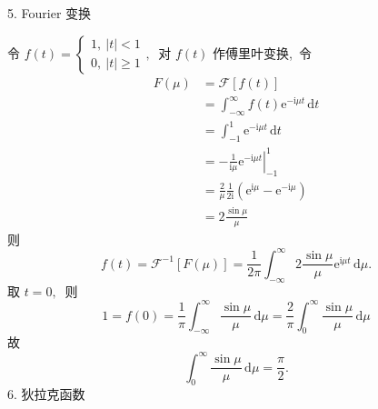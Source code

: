 \begin{solution}
		5. Fourier 变换
		
		令  $f(t)=\left\{\begin{array}{l}
			1,\ |t|<1 \\
			0,\ |t| \geq 1
		\end{array}\right. ,\ $ 对 $ f(t) $ 作傅里叶变换,\  令
		$$\begin{aligned}
			F(\mu) & =\mathscr{F}[f(t)] \\
			& =\int_{-\infty}^{\infty} f(t) \mathrm{e}^{-\mathrm{i} \mu t} \,\mathrm{d}t \\
			& =\int_{-1}^{1} \mathrm{e}^{-\mathrm{i} \mu t} \,\mathrm{d}t\\
			& =-\left.\frac{1}{\mathrm{i} \mu} \mathrm{e}^{-\mathrm{i} \mu t}\right|_{-1} ^{1} \\
			& =\frac{2}{\mu} \frac{1}{2 \mathrm{i}}\left(\mathrm{e}^{\mathrm{i} \mu}-\mathrm{e}^{-\mathrm{i} \mu}\right) \\
			& =2 \frac{\sin \mu}{\mu}
		\end{aligned}$$
		则  $$f(t)=\mathscr{F}^{-1}[F(\mu)]=\frac{1}{2 \pi} \int_{-\infty}^{\infty} 2 \frac{\sin \mu}{\mu} \mathrm{e}^{\mathrm{i} \mu t}\,\mathrm{d} \mu .$$
		取 $ t=0 ,\ $ 则
		$$1=f(0)=\frac{1}{\pi} \int_{-\infty}^{\infty} \frac{\sin \mu}{\mu} \,\mathrm{d} \mu=\frac{2}{\pi} \int_{0}^{\infty} \frac{\sin \mu}{\mu} \,\mathrm{d}\mu$$
		故  $$\int_{0}^{\infty} \frac{\sin \mu}{\mu}\,\mathrm{d} \mu=\frac{\pi}{2} . $$
		6. 狄拉克函数
		

\end{solution}
